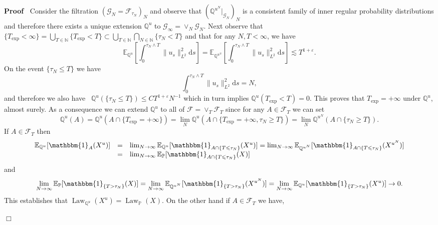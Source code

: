 \documentclass[11pt]{article}
\newcommand{\mathd}{\mathrm{d}}
\newcommand{\nobracket}{}
\newcommand{\tmop}[1]{\ensuremath{\operatorname{#1}}}
\newenvironment{proof}{\noindent\textbf{Proof\ }}{\hspace*{\fill}$\Box$\medskip}
\newcommand{\CF}{\mathscr{F}}
\newcommand{\CG}{\mathscr{G}}
\begin{document}
\begin{proof}
  Consider the filtration $\left( \CG_N = \CF_{\tau_N} \right)_N$ and observe
  that $\left( \nobracket \mathbb{Q}^{u^N} |_{\CG_N} \right)_N$ is a
  consistent family of inner regular probability distributions and therefore
  there exists a unique extension $\mathbb{Q}^u$ to $\CG_{\infty} = \vee_N
  \CG_N$. Next observe that $\{ T_{\exp} < \infty \} = \bigcup_{T \in
  \mathbb{N}} \{ T_{\exp} < T \} \subset \bigcup_{T \in \mathbb{N}} \bigcap_{N
  \in \mathbb{N}} \{ \tau_N < T \}$ and that for any $N, T < \infty$, we have
  \[ \mathbb{E}_{\mathbb{Q}^u} \left[ \int^{\tau_N \wedge T}_0 \| u_s
     \|^2_{L^2} \mathd s \right] =\mathbb{E}_{\mathbb{Q}^{u^N}} \left[
     \int^{\tau_N \wedge T}_0 \| u_s \|^2_{L^2} \mathd s \right] \lesssim T^{1
     + \varepsilon} . \]
  On the event $\{ \tau_N \leqslant T \}$ we have
  \[ \int^{\tau_N \wedge T}_0 \| u_s \|^2_{L^2} \mathd s = N, \]
  and therefore we also have \ $\mathbb{Q}^u (\{ \tau_N \leqslant T \})
  \leqslant C T^{1 + \varepsilon} N^{- 1}$ which in turn implies $\mathbb{Q}^u
  (T_{\exp} < T) = 0$. This proves that $T_{\exp} = + \infty$ under
  $\mathbb{Q}^u$, almost surely. As a consequence we can extend $\mathbb{Q}^u$
  to all of $\CF = \vee_T \CF_T$ since for any $A \in \CF_T$ we can set
  \[ \mathbb{Q}^u (A) =\mathbb{Q}^u (A \cap \{ T_{\exp} = + \infty \}) =
     \lim_N \mathbb{Q}^u (A \cap \{ T_{\exp} = + \infty, \tau_N \geqslant T
     \}) = \lim_N \mathbb{Q}^{u^N} (A \cap \{ \tau_N \geqslant T \}) . \]
  If $A \in \CF_T$ then
  \[ \begin{array}{lll}
       \mathbb{E}_{\mathbb{Q}^u} [\mathbbm{1}_A (X^u)] & = & \lim_{N
       \rightarrow \infty} \mathbb{E}_{\mathbb{Q}^u} [\mathbbm{1}_{A \cap \{ T
       \leqslant \tau_N \}} (X^u)] = \lim_{N \rightarrow \infty}
       \mathbb{E}_{\mathbb{Q}^{u^N}} [\mathbbm{1}_{A \cap \{ T \leqslant \tau_N
       \}} (X^{u^N})]\\
       & = & \lim_{N \rightarrow \infty} \mathbb{E}_{\mathbb{P}}
       [\mathbbm{1}_{A \cap \{ T \leqslant \tau_N \}} (X)]
     \end{array} \]
  and
  \[ \lim_{N \rightarrow \infty} \mathbb{E}_{\mathbb{P}} [\mathbbm{1}_{\{ T >
     \tau_N \}} (X)] = \lim_{N \rightarrow \infty}
     \mathbb{E}_{\mathbb{Q}^{u^N}} [\mathbbm{1}_{\{ T > \tau_N \}} (X^{u^N})] =
     \lim_{N \rightarrow \infty} \mathbb{E}_{\mathbb{Q}^u} [\mathbbm{1}_{\{ T >
     \tau_N \}} (X^u)] \rightarrow 0. \]
  This establishes that $\tmop{Law}_{\mathbb{Q}^u} (X^u) =
  \tmop{Law}_{\mathbb{P}} (X)$. On the other hand if $A \in \CF_T$ we have,

\end{proof}
\end{document}

